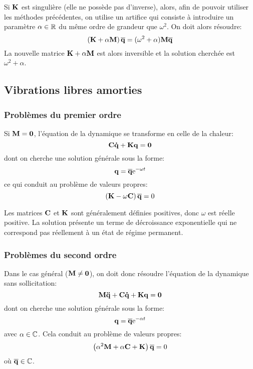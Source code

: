 Si $\MM{K}$ est singulière (elle ne possède pas d'inverse), alors, afin de pouvoir utiliser les méthodes
précédentes, on utilise un artifice qui consiste à introduire un paramètre $\alpha\in\mathbb R$ du
même ordre de grandeur que $\omega^2$. On doit alors résoudre:
\begin{equation}\left(\MM{K}+\alpha \MM{M}\right)\VV{\overline{q}} = (\omega^2+\alpha)\MM{M} \VV{\overline{q}}\end{equation}
La nouvelle matrice $\MM{K}+\alpha \MM{M}$ est alors inversible et la solution cherchée est $\omega^2+\alpha$.

\medskip
\subsection{Vibrations libres amorties}
\subsubsection{Problèmes du premier ordre}
Si $\MM{M}=\MM{0}$, l'équation de la dynamique se
transforme en celle de la chaleur:
\begin{equation} \MM{C}\VV{\dot{q}}+\MM{K}\VV{q}=\VV{0} \end{equation}
dont on cherche une solution générale sous la forme:
\begin{equation} \VV{q}=\VV{\overline{q}}\mathrm{e}^{-\omega t} \end{equation}
ce qui conduit au problème de valeurs propres:
\begin{equation} \left(\MM{K}-\omega\MM{C}\right)\VV{\overline{q}}=0\end{equation}

Les matrices $\MM{C}$ et $\MM{K}$ sont généralement définies positives, donc $\omega$ est réelle positive. La solution présente un terme de décroissance exponentielle qui ne correspond pas réellement à un état de régime permanent.

\medskip
\subsubsection{Problèmes du second ordre}
Dans le cas général ($\MM{M}\ne\MM{0}$), on doit donc résoudre l'équation de la dynamique
sans sollicitation:
\begin{equation} \MM{M}\VV{\ddot{q}}+\MM{C}\VV{\dot{q}}+\MM{K}\VV{q}=\VV{0} \end{equation}
dont on cherche une solution générale sous la forme:
\begin{equation} \VV{q}=\VV{\overline{q}}\mathrm{e}^{-\alpha t} \end{equation}
avec $\alpha\in\mathbb C$.
Cela conduit au problème de valeurs propres:
\begin{equation} \left(\alpha^2\MM{M}+\alpha\MM{C}+\MM{K}\right)\VV{\overline{q}}=0\end{equation}
où $\VV{\overline{q}}\in\CC$.


